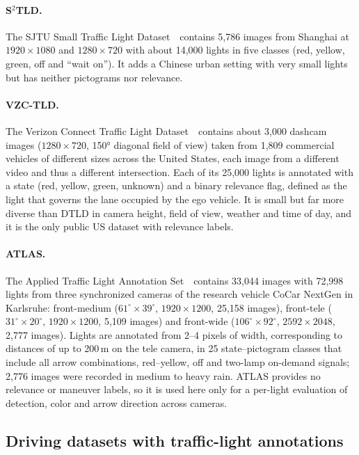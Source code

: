 \paragraph{S$^2$TLD.} The SJTU Small Traffic Light Dataset~\cite{yang2022scrdet}\,
contains 5,786 images from Shanghai at $1920\times1080$ and $1280\times720$ with about 14,000 lights in
five classes (red, yellow, green, off and ``wait on''). It adds a Chinese urban
setting with very small lights but has neither pictograms nor relevance.

\paragraph{VZC-TLD.} The Verizon Connect Traffic Light Dataset~\cite{trinci2026color}\,
contains about 3,000 dashcam images ($1280\times720$, 150° diagonal field of view) taken from 1,809
commercial vehicles of different sizes across the United States, each image from a different video
and thus a different intersection. Each of its 25,000 lights is annotated with a state (red, yellow,
green, unknown) and a binary relevance flag, defined as the light that governs the lane occupied by the
ego vehicle. It is small but far more diverse than DTLD in camera height, field of view, weather and
time of day, and it is the only public US dataset with relevance labels.

\paragraph{ATLAS.} The Applied Traffic Light Annotation Set~\cite{polley2025atlas}\,
contains 33,044 images with 72,998 lights from three synchronized cameras of the research vehicle CoCar
NextGen in Karlsruhe: front-medium ($61^\circ\times39^\circ$, $1920\times1200$, 25,158 images),
front-tele ($31^\circ\times20^\circ$, $1920\times1200$, 5,109 images) and front-wide
($106^\circ\times92^\circ$, $2592\times2048$, 2,777 images). Lights are annotated from 2--4 pixels of
width, corresponding to distances of up to 200\,m on the tele camera, in 25 state--pictogram classes
that include all arrow combinations, red--yellow, off and two-lamp on-demand signals; 2,776 images were
recorded in medium to heavy rain. ATLAS provides no relevance or maneuver labels, so it is used here
only for a per-light evaluation of detection, color and arrow direction across cameras.

\subsection{Driving datasets with traffic-light annotations}

